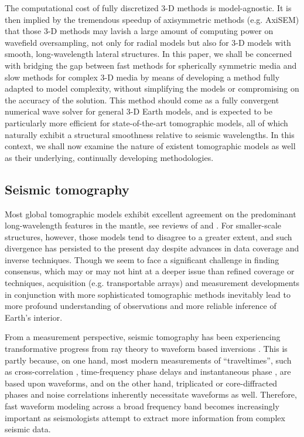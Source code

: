\documentclass[extra]{gji}
\begin{document}
The computational cost of fully discretized 3-D methods is model-agnostic. 
It is then implied by the tremendous speedup of axisymmetric methods 
(e.g. AxiSEM) that those 3-D methods may lavish a large 
amount of computing power on wavefield oversampling, not only for radial models but 
also for 3-D models with smooth, long-wavelength lateral structures.  
In this paper, we shall be concerned with bridging the gap between 
fast methods for spherically symmetric media and slow methods for
complex 3-D media by means of developing a method fully 
adapted to model complexity, without simplifying the models or 
compromising on the accuracy of the solution.
This method should come as a fully convergent numerical wave solver for 
general 3-D Earth models, and is expected to be particularly more efficient 
for state-of-the-art tomographic models, all of which naturally exhibit a structural 
smoothness relative to seismic wavelengths. In this context, we shall
now examine the nature of existent tomographic models as well as their
underlying, continually developing methodologies.

\subsection{Seismic tomography}
\label{sec:tomography}
Most global tomographic models exhibit excellent agreement on the 
predominant long-wavelength features in the mantle,
see reviews of \cite{becker2002comparison} and \cite{auer2014savani}. 
For smaller-scale structures, however, those models tend to disagree to a 
greater extent, and such divergence has persisted to the present day
despite advances in data coverage and inverse techniques. 
Though we seem to face a significant challenge in finding consensus, which 
may or may not hint at a deeper issue than refined coverage or techniques,
acquisition (e.g. transportable arrays) and measurement developments 
in conjunction with more sophisticated tomographic methods
inevitably lead to more profound understanding of observations
and more reliable inference of Earth's interior.

From a measurement perspective, 
seismic tomography has been experiencing transformative progress
from ray theory \cite[]{rawlinson2010seismic} to waveform based
inversions \cite[]{tape2009adjoint, fichtner2008theoretical}. 
This is partly because, on one hand,
most modern measurements of ``traveltimes'', 
such as cross-correlation \cite[Chap 7,][]{nolet2008breviary}, 
time-frequency phase delays \cite[]{fichtner2008theoretical, 
kristekova2009time} and instantaneous phase \cite[]{bozdaug2011misfit}, 
are based upon waveforms,
and on the other hand, triplicated \cite[]{stahler2012triplicated} or 
core-diffracted phases \cite[]{bharadwaj2013enhancing, hosseini2015multifrequency} 
and noise correlations \cite[]{basini2013influence} inherently 
necessitate waveforms as well.
Therefore, fast waveform modeling across a broad frequency band
becomes increasingly important as seismologists attempt to extract  
more information from complex seismic data. 
\end{document}
